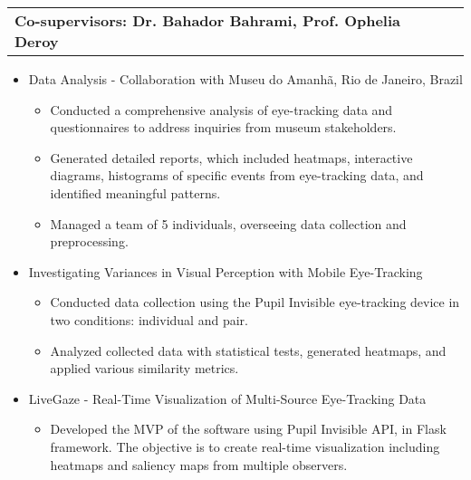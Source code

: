 \documentclass[a4paper,10pt]{article}
\begin{document}
\begin{tabularx}{\linewidth}{@{}X r@{}}
    \textbf{Co-supervisors: Dr. Bahador Bahrami, Prof. Ophelia Deroy}\\
\end{tabularx}

\begin{itemize}
    \item Data Analysis - Collaboration with Museu do Amanhã, Rio de Janeiro, Brazil
    \begin{itemize}
        \item Conducted a comprehensive analysis of eye-tracking data and questionnaires to address inquiries from museum stakeholders.
        \item Generated detailed reports, which included heatmaps, interactive diagrams, histograms of specific events from eye-tracking data, and identified meaningful patterns.
        \item Managed a team of 5 individuals, overseeing data collection and preprocessing.
    \end{itemize}
\end{itemize}

\begin{itemize}
    \item Investigating Variances in Visual Perception with Mobile Eye-Tracking
    \begin{itemize}
        \item Conducted data collection using the Pupil Invisible eye-tracking device in two conditions: individual and pair.
        \item Analyzed collected data with statistical tests, generated heatmaps, and applied various similarity metrics.       
    \end{itemize}
\end{itemize}

\begin{itemize}
    \item LiveGaze - Real-Time Visualization of Multi-Source Eye-Tracking Data
        \begin{itemize}
            \item Developed the MVP of the software using Pupil Invisible API, in Flask framework. The objective is to create real-time visualization including heatmaps and saliency maps from multiple observers.
            \end{itemize}
\end{itemize}

\end{document}

